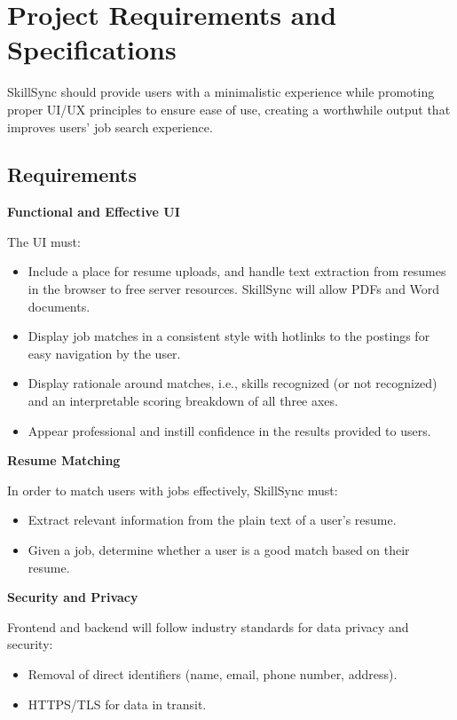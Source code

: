 \documentclass[12pt]{article}
\begin{document}
\section{Project Requirements and Specifications}

SkillSync should provide users with a minimalistic experience while promoting proper UI/UX principles to ensure ease of use, creating a worthwhile output that improves users' job search experience.

\subsection{Requirements}

\textbf{Functional and Effective UI}

The UI must:
\begin{itemize}
    \item Include a place for resume uploads, and handle text extraction from resumes in the browser to free server resources. SkillSync will allow PDFs and Word documents.
    \item Display job matches in a consistent style with hotlinks to the postings for easy navigation by the user.
    \item Display rationale around matches, i.e., skills recognized (or not recognized) and an interpretable scoring breakdown of all three axes.
    \item Appear professional and instill confidence in the results provided to users.
\end{itemize}

\textbf{Resume Matching}

In order to match users with jobs effectively, SkillSync must:
\begin{itemize}
    \item Extract relevant information from the plain text of a user's resume.
    \item Given a job, determine whether a user is a good match based on their resume.
\end{itemize}

\textbf{Security and Privacy}

Frontend and backend will follow industry standards for data privacy and security:
\begin{itemize}
    \item Removal of direct identifiers (name, email, phone number, address).
    \item HTTPS/TLS for data in transit.
\end{itemize}
\end{document}
